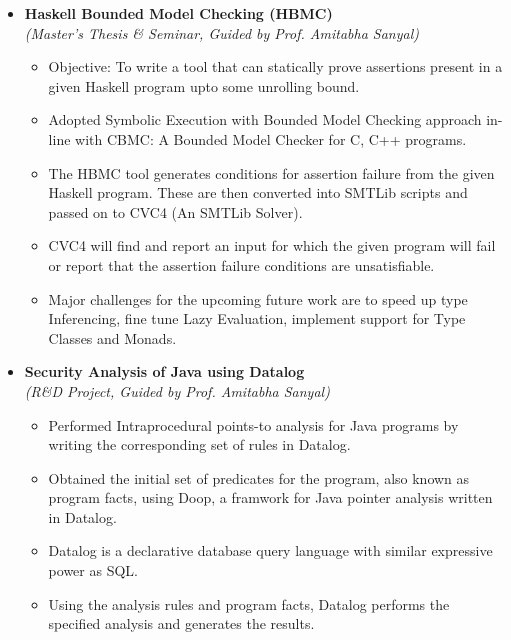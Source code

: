 \documentclass[a4paper,10pt]{article}
\newcommand{\isep}{-2 pt}
\begin{document}
\begin{itemize}

\item \textbf{ Haskell Bounded Model Checking (HBMC)} \\ \emph{(Master's Thesis \& Seminar, Guided by Prof. Amitabha Sanyal)}
    \\ [-0.6cm]
    \begin{itemize}\itemsep \isep
    \item Objective: To write a tool that can statically prove assertions present in a given Haskell program upto some unrolling bound.
    \item Adopted Symbolic Execution with Bounded Model Checking approach in-line with CBMC: A Bounded Model Checker for C, C++ programs.
    \item The HBMC tool generates conditions for assertion failure from the given Haskell program.  These are then converted into SMTLib scripts and passed on to CVC4 (An SMTLib Solver).
    \item CVC4 will find and report an input for which the given program will fail or report that the assertion failure conditions are unsatisfiable.
    \item Major challenges for the upcoming future work are to speed up type Inferencing,  fine tune Lazy Evaluation, implement support for Type Classes and Monads.
    \end{itemize}

\item \textbf{Security Analysis of Java using Datalog}
\\ {\emph{(R\&D Project, Guided by Prof. Amitabha Sanyal)}}
    \\ [-0.6cm]
    \begin{itemize}\itemsep \isep

    \item Performed Intraprocedural points-to analysis for Java programs by writing the corresponding set of rules in Datalog.
    \item Obtained the initial set of predicates for the program, also known as program facts, using Doop, a framwork for Java pointer analysis written in Datalog.
    \item Datalog is a declarative database query language with similar expressive power as SQL. 
    \item Using the analysis rules and program facts, Datalog performs the specified analysis and generates the results.

    \end{itemize}


\end{itemize}
\end{document}
